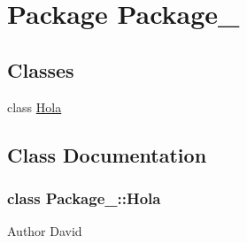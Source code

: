\hypertarget{namespace_package__1}{}\section{Package Package\+\_}
\label{namespace_package__1}
\subsection*{Classes}
\begin{DoxyCompactItemize}
\item 
class \mbox{\hyperlink{namespace_package__1_class_package__1_1_1_hola}{Hola}}
\end{DoxyCompactItemize}


\subsection{Class Documentation}
\label{class_package__1_1_1_hola}
\subsubsection{class Package\+\_\+:\+:Hola}
\begin{DoxyAuthor}{Author}
David 
\end{DoxyAuthor}
